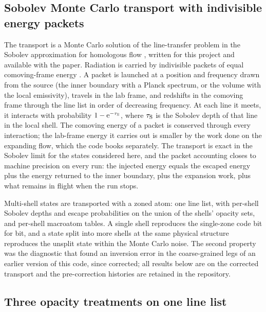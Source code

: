\documentclass[fleqn,usenatbib]{mnras}
\newcommand{\tauS}{\tau_{\rm S}}
\begin{document}
\subsection{Sobolev Monte Carlo transport with indivisible energy packets}

The transport is a Monte Carlo solution of the line-transfer problem in the Sobolev approximation for homologous flow \citep{sobolev1960,castor1970,jeffery1993}, written for this project and available with the paper. Radiation is carried by indivisible packets of equal comoving-frame energy \citep{lucy2002,lucy2005}. A packet is launched at a position and frequency drawn from the source (the inner boundary with a Planck spectrum, or the volume with the local emissivity), travels in the lab frame, and redshifts in the comoving frame through the line list in order of decreasing frequency. At each line it meets, it interacts with probability $1-{\rm e}^{-\tauS}$, where $\tauS$ is the Sobolev depth of that line in the local shell. The comoving energy of a packet is conserved through every interaction; the lab-frame energy it carries out is smaller by the work done on the expanding flow, which the code books separately. The transport is exact in the Sobolev limit for the states considered here, and the packet accounting closes to machine precision on every run: the injected energy equals the escaped energy plus the energy returned to the inner boundary, plus the expansion work, plus what remains in flight when the run stops.

Multi-shell states are transported with a zoned atom: one line list, with per-shell Sobolev depths and escape probabilities on the union of the shells' opacity sets, and per-shell macroatom tables. A single shell reproduces the single-zone code bit for bit, and a state split into more shells at the same physical structure reproduces the unsplit state within the Monte Carlo noise. The second property was the diagnostic that found an inversion error in the coarse-grained legs of an earlier version of this code, since corrected; all results below are on the corrected transport and the pre-correction histories are retained in the repository.

\subsection{Three opacity treatments on one line list}
\end{document}
